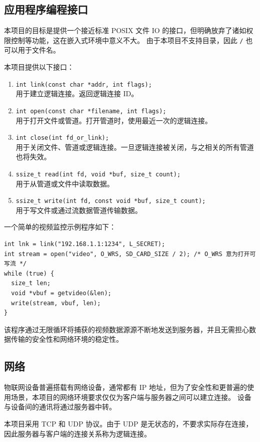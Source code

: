 \documentclass{ctexart}
\begin{document}
\subsection{应用程序编程接口}
\label{design-api}
本项目的目标是提供一个接近标准 POSIX 文件 IO 的接口，但明确放弃了诸如权限控制等功能，这在嵌入式环境中意义不大。
由于本项目不支持目录，因此 \verb|/| 也可以用于文件名。

本项目提供以下接口：
\begin{enumerate}
	\item \verb|int link(const char *addr, int flags);|\\
	用于建立逻辑连接。返回逻辑连接 ID。
	\item \verb|int open(const char *filename, int flags);|\\
	用于打开文件或管道。打开管道时，使用最近一次的逻辑连接。
	\item \verb|int close(int fd_or_link);|\\
	用于关闭文件、管道或逻辑连接。一旦逻辑连接被关闭，与之相关的所有管道也将失效。
	\item \verb|ssize_t read(int fd, void *buf, size_t count);|\\
	用于从管道或文件中读取数据。
	\item \verb|ssize_t write(int fd, const void *buf, size_t count);|\\
	用于写文件或通过流数据管道传输数据。
\end{enumerate}

一个简单的视频监控示例程序如下：
\begin{verbatim}
int lnk = link("192.168.1.1:1234", L_SECRET);
int stream = open("video", O_WRS, SD_CARD_SIZE / 2); /* O_WRS 意为打开可写流 */
while (true) {
  size_t len;
  void *vbuf = getvideo(&len);
  write(stream, vbuf, len);
}
\end{verbatim}
该程序通过无限循环将捕获的视频数据源源不断地发送到服务器，并且无需担心数据传输的安全性和网络环境的稳定性。

\subsection{网络}
\label{design-network}
物联网设备普遍搭载有网络设备，通常都有 IP 地址，但为了安全性和更普遍的使用场景，本项目的网络环境要求仅仅为客户端与服务器之间可以建立连接。
设备与设备间的通讯将通过服务器中转。

本项目采用 TCP 和 UDP 协议。由于 UDP 是无状态的，不要求实际存在连接，因此服务器与客户端的连接关系称为逻辑连接。
\end{document}
